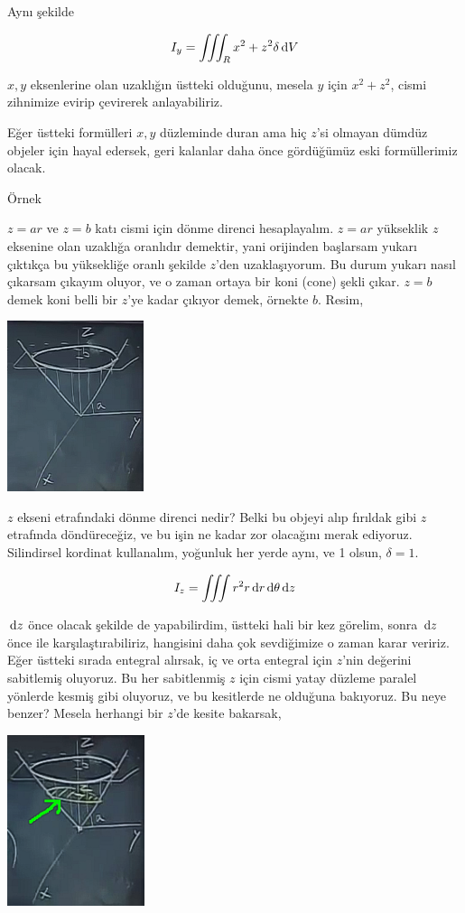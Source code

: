 \documentclass[12pt,fleqn]{article}\usepackage{../../common}
\begin{document}
Aynı şekilde

$$ 
I_y = \iiint_R x^2 + z^2 \delta \,\mathrm{d} V
$$

$x,y$ eksenlerine olan uzaklığın üstteki olduğunu, mesela $y$ için
$x^2+z^2$, cismi zihnimize evirip çevirerek anlayabiliriz.

Eğer üstteki formülleri $x,y$ düzleminde duran ama hiç $z$'si olmayan
dümdüz objeler için hayal edersek, geri kalanlar daha önce gördüğümüz eski
formüllerimiz olacak.

Örnek

$z=ar$ ve $z=b$ katı cismi için dönme direnci hesaplayalım. $z=ar$
yükseklik $z$ eksenine olan uzaklığa oranlıdır demektir, yani orijinden
başlarsam yukarı çıktıkça bu yüksekliğe oranlı şekilde $z$'den
uzaklaşıyorum. Bu durum yukarı nasıl çıkarsam çıkayım oluyor, ve o zaman
ortaya bir koni (cone) şekli çıkar. $z=b$ demek koni belli bir $z$'ye kadar
çıkıyor demek, örnekte $b$. Resim,

\includegraphics[height=5cm]{25_11.png}

$z$ ekseni etrafındaki dönme direnci nedir? Belki bu objeyi alıp fırıldak
gibi $z$ etrafında döndüreceğiz, ve bu işin ne kadar zor olacağını merak
ediyoruz. Silindirsel kordinat kullanalım, yoğunluk her yerde aynı, ve 1
olsun, $\delta = 1$.

$$ 
I_z = \iiint r^2 r \,\mathrm{d} r \,\mathrm{d} \theta \,\mathrm{d} z
$$

$\,\mathrm{d} z$ önce olacak şekilde de yapabilirdim, üstteki hali bir kez görelim,
sonra $\,\mathrm{d} z$ önce ile karşılaştırabiliriz, hangisini daha çok sevdiğimize
o zaman karar veririz. Eğer üstteki sırada entegral alırsak, iç ve orta
entegral için $z$'nin değerini sabitlemiş oluyoruz. Bu her sabitlenmiş $z$
için cismi yatay düzleme paralel yönlerde kesmiş gibi oluyoruz, ve bu
kesitlerde ne olduğuna bakıyoruz. Bu neye benzer? Mesela herhangi bir
$z$'de kesite bakarsak, 

\includegraphics[height=5cm]{25_12.png}
\end{document}
